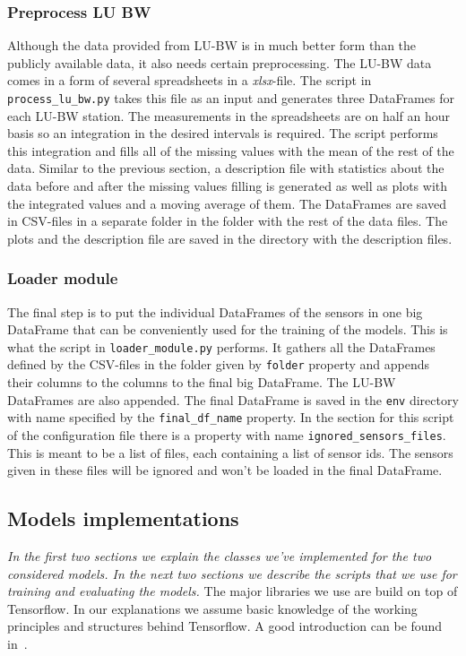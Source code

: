 \documentclass[12pt,a4paper,twoside]{scrartcl}
\numberwithin{equation}{section}
\begin{document}
\subsubsection{Preprocess LU BW}\label{sec:preproc-lu-bw-module}
Although the data provided from LU-BW is in much better form than the publicly available data, it also needs certain preprocessing. The LU-BW data comes in a form of several spreadsheets in a \emph{xlsx}-file. The script in \texttt{process\_lu\_bw.py} takes this file as an input and generates three DataFrames for each LU-BW station. The measurements in the spreadsheets are on half an hour basis so an integration in the desired intervals is required. The script performs this integration and fills all of the missing values with the mean of the rest of the data. Similar to the previous section, a description file with statistics about the data before and after the missing values filling is generated as well as plots with the integrated values and a moving average of them. The DataFrames are saved in CSV-files in a separate folder in the folder with the rest of the data files. The plots and the description file are saved in the directory with the description files.
\subsubsection{Loader module}\label{sec:load-module}
The final step is to put the individual DataFrames of the sensors in one big DataFrame that can be conveniently used for the training of the models. This is what the script in \texttt{loader\_module.py} performs. It gathers all the DataFrames defined by the CSV-files in the folder given by \texttt{folder} property and appends their columns to the columns to the final big DataFrame. The LU-BW DataFrames are also appended. The final DataFrame is saved in the \texttt{env} directory with name specified by the \texttt{final\_df\_name} property. In the section for this script of the configuration file there is a property with name \texttt{ignored\_sensors\_files}. This is meant to be a list of files, each containing a list of sensor ids. The sensors given in these files will be ignored and won't be loaded in the final DataFrame.
\subsection{Models implementations}\label{sec:impl-model}
\noindent\emph{In the first two sections we explain the classes we've implemented for the two considered models. In the next two sections we describe the scripts that we use for training and evaluating the models.}
The major libraries we use are build on top of Tensorflow. In our explanations we assume basic knowledge of the working principles and structures behind Tensorflow. A good introduction can be found in~\cite{tfnintro}.
\end{document}
